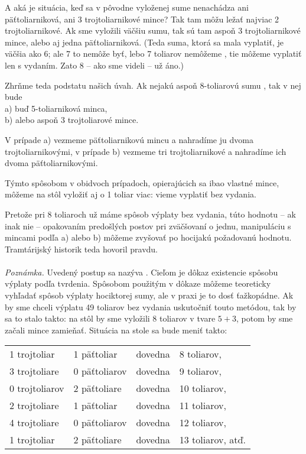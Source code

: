 {{A aká je situácia, keď sa v pôvodne vyloženej sume nenachádza ani päťtoliarniková, ani 3 trojtoliarnikové mince? Tak tam môžu ležať najviac 2 trojtoliarnikové. Ak sme vyložili väčšiu sumu, tak sú tam aspoň 3 trojtoliarnikové mince, alebo aj jedna päťtoliarniková. (Teda suma, ktorá sa mala vyplatiť, je väčšia ako 6; ale 7 to nemôže byť, lebo 7 toliarov nemôžeme , tie môžeme vyplatiť len s vydaním. Zato 8 -- ako sme videli -- už áno.)

Zhrňme teda podstatu našich úvah. Ak nejakú aspoň 8-toliarovú sumu , tak v nej bude\\
a) buď 5-toliarniková minca,\\
b) alebo aspoň 3 trojtoliarové mince. 

 V prípade a) vezmeme päťtoliarnikovú mincu a nahradíme ju dvoma trojtoliarnikovými, v prípade b) vezmeme tri trojtoliarnikové a nahradíme ich dvoma päťtoliarnikovými. 

Týmto spôsobom v obidvoch prípadoch, opierajúcich sa ibao vlastné mince, môžeme na stôl vyložiť aj o 1 toliar viac: vieme vyplatiť bez vydania. 

Pretože pri 8 toliaroch už máme spôsob výplaty bez vydania, túto hodnotu -- ak inak nie -- opakovaním predošlých postov pri zväčšovaní o jednu, manipuláciu s mincami podľa a) alebo b) môžeme zvyšovať po hocijakú požadovanú hodnotu. Tramtárijský historik teda hovoril pravdu.\\
\\
\textit{Poznámka.} Uvedený postup sa nazýva . Cieľom je dôkaz existencie spôsobu výplaty podľa tvrdenia. Spôsobom použitým v dôkaze môžeme teoreticky vyhľadať spôsob výplaty hociktorej sumy, ale v praxi je to dosť ťažkopádne. Ak by sme chceli výplatu 49 toliarov bez vydania uskutočniť touto metódou, tak by sa to stalo takto: na stôl by sme vyložili 8 toliarov v tvare $5+3$, potom by sme začali mince zamieňať. Situácia na stole sa bude meniť takto:\\
\begin{tabular}{l l l l}
1 trojtoliar & 1 päťtoliar & dovedna & 8 toliarov, \\
3 trojtoliare & 0 päťtoliarov & dovedna & 9 toliarov, \\
0 trojtoliarov & 2 päťtoliare & dovedna & 10 toliarov, \\
2 trojtoliare & 1 päťtoliar & dovedna & 11 toliarov, \\
4 trojtoliare & 0 päťtoliarov & dovedna & 12 toliarov, \\
1 trojtoliar & 2 päťtoliare & dovedna & 13 toliarov, atď.\\
\end{tabular}

}}
